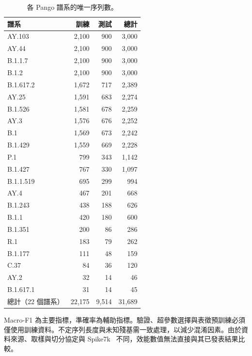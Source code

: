 \documentclass[10pt,a4paper]{article}
\begin{document}
\begin{table}[ht]
    \centering
    \caption{各 Pango 譜系的唯一序列數。}
    \label{tab:lineage-frequency}
    \footnotesize
    \setlength{\tabcolsep}{4pt}
    \renewcommand{\arraystretch}{1.05}
    \begin{tabular*}{0.62\textwidth}{@{\extracolsep{\fill}}lrrr@{}}
        \toprule
        譜系 & 訓練 & 測試 & 總計 \\
        \midrule
        AY.103    & 2,100 & 900 & 3,000 \\
        AY.44     & 2,100 & 900 & 3,000 \\
        B.1.1.7   & 2,100 & 900 & 3,000 \\
        B.1.2     & 2,100 & 900 & 3,000 \\
        B.1.617.2 & 1,672 & 717 & 2,389 \\
        AY.25     & 1,591 & 683 & 2,274 \\
        B.1.526   & 1,581 & 678 & 2,259 \\
        AY.3      & 1,576 & 676 & 2,252 \\
        B.1       & 1,569 & 673 & 2,242 \\
        B.1.429   & 1,559 & 669 & 2,228 \\
        P.1       & 799 & 343 & 1,142 \\
        B.1.427   & 767 & 330 & 1,097 \\
        B.1.1.519 & 695 & 299 & 994 \\
        AY.4      & 467 & 201 & 668 \\
        B.1.243   & 438 & 188 & 626 \\
        B.1.1     & 420 & 180 & 600 \\
        B.1.351   & 200 & 86 & 286 \\
        R.1       & 183 & 79 & 262 \\
        B.1.177   & 111 & 48 & 159 \\
        C.37      & 84 & 36 & 120 \\
        AY.2      & 32 & 14 & 46 \\
        B.1.617.1 & 31 & 14 & 45 \\
        \midrule
        總計（22 個譜系） & 22,175 & 9,514 & 31,689 \\
        \bottomrule
    \end{tabular*}
\end{table}

Macro-F1 為主要指標，準確率為輔助指標。驗證、超參數選擇與表徵預訓練必須僅使用訓練資料。不定序列長度與未知殘基需一致處理，以減少混淆因素。由於資料來源、取樣與切分協定與 Spike7k~\cite{murad2024snn} 不同，效能數值無法直接與其已發表結果比較。
\end{document}
